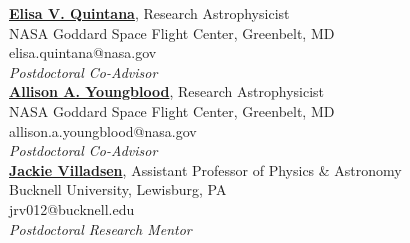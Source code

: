 \documentclass[letter,12pt]{article}
\begin{document}
\noindent
\href{https://science.gsfc.nasa.gov/sci/bio/elisa.quintana}{\textbf{Elisa V. Quintana}}, Research Astrophysicist \\ NASA Goddard Space Flight Center, Greenbelt, MD \\
elisa.quintana@nasa.gov \\
\textit{Postdoctoral Co-Advisor} \\

\noindent
\href{https://science.gsfc.nasa.gov/sed/bio/allison.a.youngblood}{\textbf{Allison A. Youngblood}}, Research Astrophysicist \\ NASA Goddard Space Flight Center, Greenbelt, MD \\
allison.a.youngblood@nasa.gov \\
\textit{Postdoctoral Co-Advisor} \\

\noindent
\href{https://www.bucknell.edu/fac-staff/jackie-villadsen}{\textbf{Jackie Villadsen}}, Assistant Professor of Physics \& Astronomy \\ Bucknell University, Lewisburg, PA \\
jrv012@bucknell.edu \\
\textit{Postdoctoral Research Mentor} \\
\end{document}
